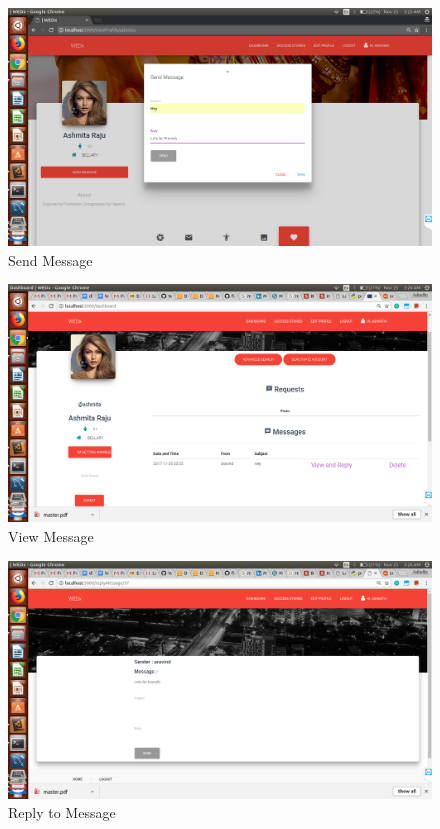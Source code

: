 \documentclass[12pt]{report}
\begin{document}
\begin{figure}[!htb]
    \centering
    \includegraphics[width=1\textwidth]{sc-16.png}
    \caption{Send Message}
    \label{fig:Send Message}
\end{figure}

\begin{figure}[!htb]
    \centering
    \includegraphics[width=1\textwidth]{sc-17.png}
    \caption{View Message}
    \label{fig:View Message}
\end{figure}

\begin{figure}[!htb]
    \centering
    \includegraphics[width=1\textwidth]{sc-18.png}
    \caption{Reply to Message}
    \label{fig:Reply to Message}
\end{figure}
\end{document}
